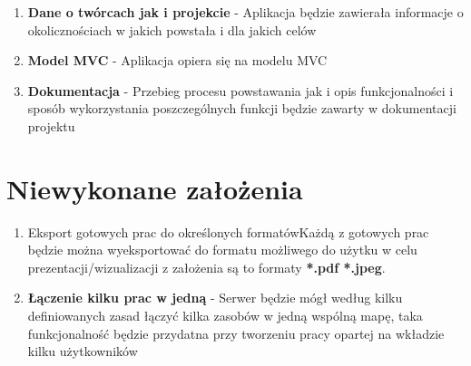 \begin{enumerate}
  \item \textbf{Dane o twórcach jak i projekcie} - Aplikacja będzie zawierała informacje o okolicznościach w jakich powstała i dla jakich celów
  
  \item \textbf{Model MVC} - Aplikacja opiera się na modelu MVC
  
  \item \textbf{Dokumentacja} - Przebieg procesu powstawania jak i opis funkcjonalności i sposób wykorzystania poszczególnych funkcji będzie zawarty w dokumentacji projektu
\end{enumerate}



\section{Niewykonane założenia}

\begin{enumerate}
  \item{Eksport gotowych prac do określonych formatów}{Każdą z gotowych prac będzie można wyeksportować do formatu możliwego do użytku w celu prezentacji/wizualizacji z założenia są to formaty \textbf{*.pdf *.jpeg}.}

  \item \textbf{Łączenie kilku prac w jedną} - Serwer będzie mógł według kilku definiowanych zasad łączyć kilka zasobów w jedną wspólną mapę, taka funkcjonalność będzie przydatna przy tworzeniu pracy opartej na wkładzie kilku użytkowników
  
\end{enumerate}